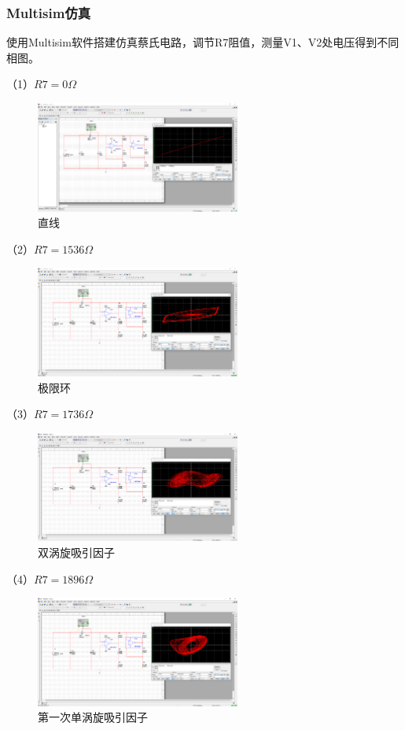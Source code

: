 \documentclass[10pt,a4paper,twoside,UTF8]{ctexart}
\begin{document}
\subsubsection{Multisim仿真}
使用Multisim软件搭建仿真蔡氏电路，调节R7阻值，测量V1、V2处电压得到不同相图。

（1）$R7=0\Omega$
\begin{figure}[H]
	\centering
	\includegraphics[width=0.6\textwidth]{fig//fig.1.1.PNG}
	\caption{直线}	
\end{figure}
（2）$R7=1536\Omega$
\begin{figure}[H]
	\centering
	\includegraphics[width=0.6\textwidth]{fig//fig.1.2.PNG}
	\caption{极限环}	
\end{figure}
（3）$R7=1736\Omega$
\begin{figure}[H]
	\centering
	\includegraphics[width=0.6\textwidth]{fig//fig.1.3.PNG}
	\caption{双涡旋吸引因子}	
\end{figure}
（4）$R7=1896\Omega$
\begin{figure}[H]
	\centering
	\includegraphics[width=0.6\textwidth]{fig//fig.1.4.PNG}
	\caption{第一次单涡旋吸引因子}	
\end{figure}
\end{document}
